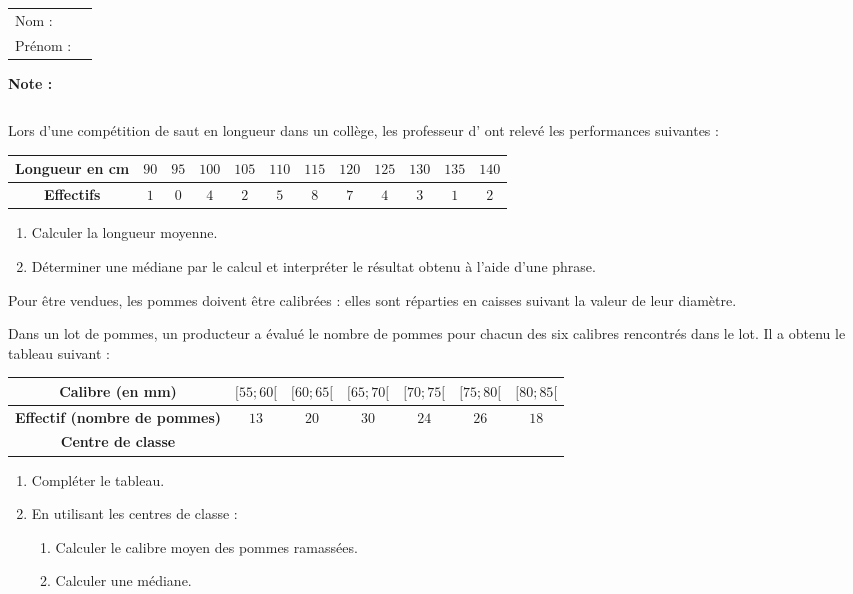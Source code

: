 \documentclass[10pt,french]{book}
\newcommand\competences{
\setcounter{exo}{0}
\begin{tabular}{ll} Nom : \\[5pt] Prénom : \end{tabular}
\hfill
\textbf{Note :}\renewcommand\arraystretch{2.3}
\begin{tabularx}{0.18\linewidth}{|X|}
\hline
\slashbox{\Huge\bfseries\phantom{10}}{\Huge\bfseries 10}\\
\hline
\end{tabularx}\renewcommand\arraystretch{1}\medskip
}
\begin{document}
\competences

\exo Lors d'une compétition de saut en longueur dans un collège, les professeur d' ont relevé les performances suivantes :

\begin{center}
\renewcommand\arraystretch{1.5}
	\begin{tabular}{|*{12}{c|}}
	\hline
		{\bf Longueur en cm} & $90$ & $95$ & $100$ & $105$ & $110$ & $115$ & $120$ & $125$ & $130$ & $135$ & $140$ \\
	\hline
		{\bf Effectifs} & $1$ & $0$ & $4$ & $2$ & $5$ & $8$ & $7$ & $4$ & $3$ & $1$ & $2$ \\
	\hline
	\end{tabular}
\end{center}

\begin{enumerate}
	\item Calculer la longueur moyenne.
	\item Déterminer une médiane par le calcul et interpréter le résultat obtenu à l'aide d'une phrase.
\end{enumerate}\bigskip

\exo Pour être vendues, les pommes doivent être calibrées : elles sont réparties en caisses suivant la valeur de leur diamètre.\par
Dans un lot de pommes, un producteur a évalué le nombre de pommes pour chacun des six calibres rencontrés dans le lot. Il a obtenu le tableau suivant :\medskip

\begin{center}
\renewcommand\arraystretch{1.5}
	\begin{tabular}{|c|c|c|c|c|c|c|}
	\hline
	   {\bf Calibre (en mm)} & $[55;60[$ & $[60;65[$ & $[65;70[$ & $[70;75[$ & $[75;80[$ & $[80;85[$\\
    \hline
        {\bf Effectif (nombre de pommes)} & $13$ & $20$ & $30$ & $24$ & $26$ & $18$\\
    \hline
        {\bf Centre de classe} & & & & & & \\
    \hline
    \end{tabular}
\end{center}
%
\begin{enumerate}
    \item Compléter le tableau.
    \item En utilisant les centres de classe :
        \begin{enumerate}
            \item Calculer le calibre moyen des pommes ramassées.
            \item Calculer une médiane.
        \end{enumerate}
\end{enumerate}\clearpage
\end{document}
